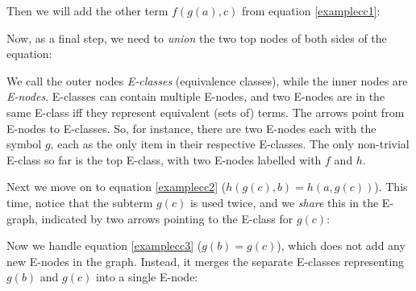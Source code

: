 \documentclass[12pt,a4paper,twoside,openright]{report}
\numberwithin{equation}{chapter}		%
\numberwithin{figure}{chapter}			%
\numberwithin{table}{chapter}			%
\theoremstyle{definition}
\theoremstyle{plain}
\def \globalscale {1.000000}
\begin{document}
Then we will add the other term $f(g(a), c)$ from equation \ref{examplecc1}:
\begin{center}
	\begin{tikzpicture}[y=1cm, x=1cm, yscale=\globalscale,xscale=\globalscale, every node/.append style={scale=\globalscale}, inner sep=0pt, outer sep=0pt]
		
	\end{tikzpicture}
    \label{exampleBasic2}
\end{center}

Now, as a final step, we need to \emph{union} the two top nodes of both sides of the equation:
\begin{center}
	\begin{tikzpicture}[y=1cm, x=1cm, yscale=\globalscale,xscale=\globalscale, every node/.append style={scale=\globalscale}, inner sep=0pt, outer sep=0pt]
		
	\end{tikzpicture}
	\label{exampleBasic3}
\end{center}
We call the outer nodes \emph{E-classes} (equivalence classes), while the inner nodes are \emph{E-nodes}. E-classes can contain multiple E-nodes, and two E-nodes are in the same E-class iff they represent equivalent (sets of) terms. The arrows point from E-nodes to E-classes. So, for instance, there are two E-nodes each with the symbol $g$, each as the only item in their respective E-classes. The only non-trivial E-class so far is the top E-class, with two E-nodes labelled with $f$ and $h$.

Next we move on to equation \ref{examplecc2} ($h(g(c), b) = h(a, g(c))$). This time, notice that the subterm $g(c)$ is used twice, and we \emph{share} this in the E-graph, indicated by two arrows pointing to the E-class for $g(c)$:
\begin{center}
\begin{tikzpicture}[y=1cm, x=1cm, yscale=\globalscale,xscale=\globalscale, every node/.append style={scale=\globalscale}, inner sep=0pt, outer sep=0pt]
  
\end{tikzpicture}
\label{exampleBasic4}
\end{center}

Now we handle equation \ref{examplecc3} ($g(b) = g(c)$), which does not add any new E-nodes in the graph. Instead, it merges the separate E-classes representing $g(b)$ and $g(c)$ into a single E-node:

\begin{center}
	\begin{tikzpicture}[y=1cm, x=1cm, yscale=\globalscale,xscale=\globalscale, every node/.append style={scale=\globalscale}, inner sep=0pt, outer sep=0pt]
		
	\end{tikzpicture}
	\label{exampleBasic5}
\end{center}
\end{document}
